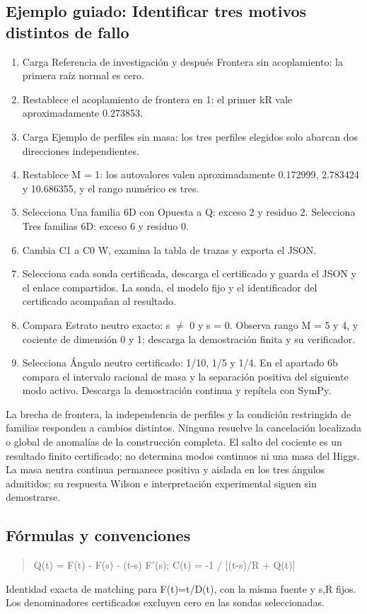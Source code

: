 \documentclass[11pt,a4paper]{article}
\begin{document}
\subsection*{Ejemplo guiado: Identificar tres motivos distintos de fallo}
\begin{enumerate}
\item Carga Referencia de investigación y después Frontera sin acoplamiento: la primera raíz normal es cero.
\item Restablece el acoplamiento de frontera en 1: el primer kR vale aproximadamente 0.273853.
\item Carga Ejemplo de perfiles sin masa: los tres perfiles elegidos solo abarcan dos direcciones independientes.
\item Restablece M = 1: los autovalores valen aproximadamente 0.172999, 2.783424 y 10.686355, y el rango numérico es tres.
\item Selecciona Una familia 6D con Opuesta a Q: exceso 2 y residuo 2. Selecciona Tres familias 6D: exceso 6 y residuo 0.
\item Cambia C1 a C0 W, examina la tabla de trazas y exporta el JSON.
\item Selecciona cada sonda certificada, descarga el certificado y guarda el JSON y el enlace compartidos. La sonda, el modelo fijo y el identificador del certificado acompañan al resultado.
\item Compara Estrato neutro exacto: s \ensuremath{\neq} 0 y s = 0. Observa rango M = 5 y 4, y cociente de dimensión 0 y 1; descarga la demostración finita y su verificador.
\item Selecciona Ángulo neutro certificado: 1/10, 1/5 y 1/4. En el apartado 6b compara el intervalo racional de masa y la separación positiva del siguiente modo activo. Descarga la demostración continua y repítela con SymPy.
\end{enumerate}
La brecha de frontera, la independencia de perfiles y la condición restringida de familias responden a cambios distintos. Ninguna resuelve la cancelación localizada o global de anomalías de la construcción completa. El salto del cociente es un resultado finito certificado; no determina modos continuos ni una masa del Higgs. La masa neutra continua permanece positiva y aislada en los tres ángulos admitidos; su respuesta Wilson e interpretación experimental siguen sin demostrarse.
\subsection*{Fórmulas y convenciones}
\begin{quote}Q(t) = F(t) - F(s) - (t-s) F\ensuremath{\prime}(s); C(t) = -1 / [(t-s)/R + Q(t)]\end{quote}
Identidad exacta de matching para F(t)=t/D(t), con la misma fuente y s,R fijos. Los denominadores certificados excluyen cero en las sondas seleccionadas.
\end{document}

